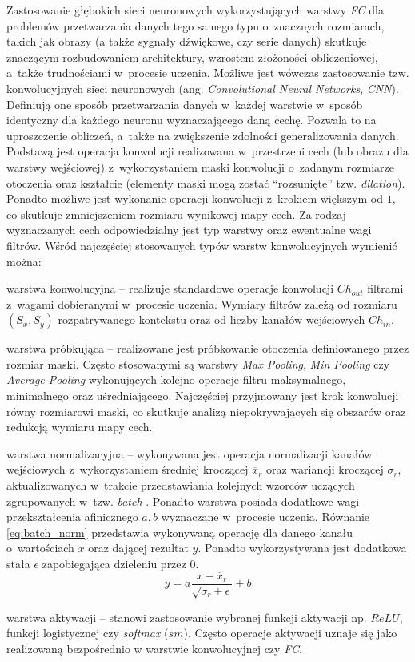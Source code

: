 Zastosowanie głębokich sieci neuronowych wykorzystujących warstwy \emph{FC} dla problemów przetwarzania danych tego samego typu o~znacznych rozmiarach, takich jak obrazy (a także sygnały dźwiękowe, czy serie danych) skutkuje znaczącym rozbudowaniem architektury, wzrostem złożoności obliczeniowej, a~także trudnościami w~procesie uczenia. 
Możliwe jest wówczas zastosowanie tzw. konwolucyjnych sieci neuronowych (ang. \emph{Convolutional Neural Networks}, \emph{CNN}).
Definiują one sposób przetwarzania danych w~każdej warstwie w~sposób identyczny dla każdego neuronu wyznaczającego daną cechę.
Pozwala to na uproszczenie obliczeń, a~także na zwiększenie zdolności generalizowania danych.
Podstawą jest operacja konwolucji realizowana w~przestrzeni cech (lub obrazu dla warstwy wejściowej) z~wykorzystaniem maski konwolucji o~zadanym rozmiarze otoczenia oraz kształcie (elementy maski mogą zostać ``rozsunięte'' tzw. \emph{dilation}). 
Ponadto możliwe jest wykonanie operacji konwolucji z~krokiem większym od $1$, co skutkuje zmniejszeniem rozmiaru wynikowej mapy cech.
Za rodzaj wyznaczanych cech odpowiedzialny jest typ warstwy oraz ewentualne wagi filtrów. 
Wśród najczęściej stosowanych typów warstw konwolucyjnych wymienić można:
\begin{description}
\item warstwa konwolucyjna -- realizuje standardowe operacje konwolucji $Ch_{out}$ filtrami z~wagami dobieranymi w~procesie uczenia. Wymiary filtrów zależą od rozmiaru $(S_x,S_y)$ rozpatrywanego kontekstu oraz od liczby kanałów wejściowych $Ch_{in}$. 
\item warstwa próbkująca -- realizowane jest próbkowanie otoczenia definiowanego przez rozmiar maski.
Często stosowanymi są warstwy \emph{Max Pooling}, \emph{Min Pooling} czy \emph{Average Pooling} wykonujących kolejno operacje filtru maksymalnego, minimalnego oraz uśredniającego. Najczęściej przyjmowany jest krok konwolucji równy rozmiarowi maski, co skutkuje analizą niepokrywających się obszarów oraz redukcją wymiaru mapy cech.
\item warstwa normalizacyjna -- wykonywana jest operacja normalizacji kanałów wejściowych z~wykorzystaniem średniej kroczącej $\overline{x}_r$ oraz wariancji kroczącej $\sigma_r$, aktualizowanych w~trakcie przedstawiania kolejnych wzorców uczących zgrupowanych w~tzw. \emph{batch} .
Ponadto warstwa posiada dodatkowe wagi przekształcenia afinicznego $a, b$ wyznaczane w~procesie uczenia.
Równanie \eqref{eq:batch_norm} przedstawia wykonywaną operację dla danego kanału o~wartościach $x$ oraz dającej rezultat $y$. Ponadto wykorzystywana jest dodatkowa stała $\epsilon$ zapobiegająca dzieleniu przez $0$.  
\begin{equation}
y = a \frac{x-\overline{x}_r}{\sqrt{\sigma_r + \epsilon}} + b
\label{eq:batch_norm}
\end{equation}
\item warstwa aktywacji -- stanowi zastosowanie wybranej funkcji aktywacji np. $ReLU$, funkcji logistycznej czy \emph{softmax} ($sm$).
Często operacje aktywacji uznaje się jako realizowaną bezpośrednio w warstwie konwolucyjnej czy \emph{FC}.
\end{description}
